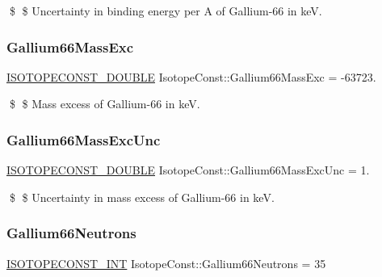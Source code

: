 \$ \$ Uncertainty in binding energy per A of Gallium-\/66 in keV. \mbox{\label{group___isotope_const-_gallium-_ga66_ga013c81f80d3355e8045f96685488db0c}} 
\subsubsection{\texorpdfstring{Gallium66\+Mass\+Exc}{Gallium66MassExc}}
{\footnotesize\ttfamily \mbox{\hyperlink{group___isotope_const-_macros_ga8f45a7272ce02c0b4c65c44636ed719a}{I\+S\+O\+T\+O\+P\+E\+C\+O\+N\+S\+T\+\_\+\+D\+O\+U\+B\+LE}} Isotope\+Const\+::\+Gallium66\+Mass\+Exc = -\/63723.}

\$ \$ Mass excess of Gallium-\/66 in keV. \mbox{\label{group___isotope_const-_gallium-_ga66_ga821f06c32d2e48a40b0b61fb01510044}} 
\subsubsection{\texorpdfstring{Gallium66\+Mass\+Exc\+Unc}{Gallium66MassExcUnc}}
{\footnotesize\ttfamily \mbox{\hyperlink{group___isotope_const-_macros_ga8f45a7272ce02c0b4c65c44636ed719a}{I\+S\+O\+T\+O\+P\+E\+C\+O\+N\+S\+T\+\_\+\+D\+O\+U\+B\+LE}} Isotope\+Const\+::\+Gallium66\+Mass\+Exc\+Unc = 1.}

\$ \$ Uncertainty in mass excess of Gallium-\/66 in keV. \mbox{\label{group___isotope_const-_gallium-_ga66_ga7d4ab4f72120614ca285c051835467df}} 
\subsubsection{\texorpdfstring{Gallium66\+Neutrons}{Gallium66Neutrons}}
{\footnotesize\ttfamily \mbox{\hyperlink{group___isotope_const-_macros_ga5f18360b3e99483a35c32d789e62621c}{I\+S\+O\+T\+O\+P\+E\+C\+O\+N\+S\+T\+\_\+\+I\+NT}} Isotope\+Const\+::\+Gallium66\+Neutrons = 35}

